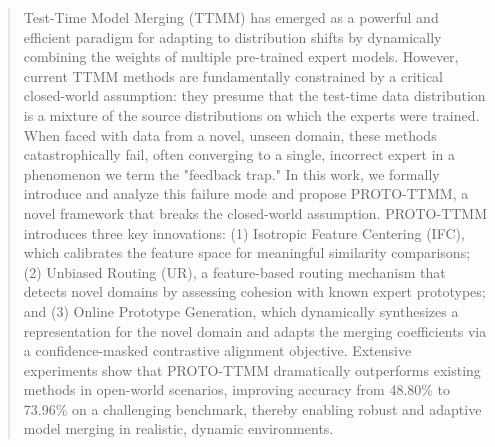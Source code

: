 \documentclass[twoside]{article}
\begin{document}

\printAffiliationsAndNotice{\icmlEqualContribution} %

\begin{abstract}
Test-Time Model Merging (TTMM) has emerged as a powerful and efficient paradigm for adapting to distribution shifts by dynamically combining the weights of multiple pre-trained expert models. However, current TTMM methods are fundamentally constrained by a critical closed-world assumption: they presume that the test-time data distribution is a mixture of the source distributions on which the experts were trained. When faced with data from a novel, unseen domain, these methods catastrophically fail, often converging to a single, incorrect expert in a phenomenon we term the "feedback trap." In this work, we formally introduce and analyze this failure mode and propose PROTO-TTMM, a novel framework that breaks the closed-world assumption. PROTO-TTMM introduces three key innovations: (1) Isotropic Feature Centering (IFC), which calibrates the feature space for meaningful similarity comparisons; (2) Unbiased Routing (UR), a feature-based routing mechanism that detects novel domains by assessing cohesion with known expert prototypes; and (3) Online Prototype Generation, which dynamically synthesizes a representation for the novel domain and adapts the merging coefficients via a confidence-masked contrastive alignment objective. Extensive experiments show that PROTO-TTMM dramatically outperforms existing methods in open-world scenarios, improving accuracy from 48.80\% to 73.96\% on a challenging benchmark, thereby enabling robust and adaptive model merging in realistic, dynamic environments.
\end{abstract}
\end{document}
